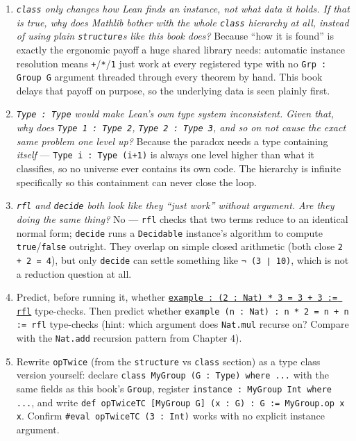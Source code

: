 \begin{enumerate}
\def\labelenumi{\arabic{enumi}.}
\item
  \emph{\texttt{class} only changes how Lean finds an instance, not what data it holds. If that is true, why does Mathlib bother with the whole \texttt{class} hierarchy at all, instead of using plain \texttt{structure}s like this book does?} Because ``how it is found'' is exactly the ergonomic payoff a huge shared library needs: automatic instance resolution means \texttt{+}/\texttt{*}/\texttt{1} just work at every registered type with no \texttt{Grp : Group G} argument threaded through every theorem by hand. This book delays that payoff on purpose, so the underlying data is seen plainly first.
\item
  \emph{\texttt{Type : Type} would make Lean's own type system inconsistent. Given that, why does \texttt{Type 1 : Type 2}, \texttt{Type 2 : Type 3}, and so on not cause the exact same problem one level up?} Because the paradox needs a type containing \emph{itself} --- \texttt{Type i : Type (i+1)} is always one level higher than what it classifies, so no universe ever contains its own code. The hierarchy is infinite specifically so this containment can never close the loop.
\item
  \emph{\texttt{rfl} and \texttt{decide} both look like they ``just work'' without argument. Are they doing the same thing?} No --- \texttt{rfl} checks that two terms reduce to an identical normal form; \texttt{decide} runs a \texttt{Decidable} instance's algorithm to compute \texttt{true}/\texttt{false} outright. They overlap on simple closed arithmetic (both close \texttt{2 + 2 = 4}), but only \texttt{decide} can settle something like \texttt{¬ (3 ∣ 10)}, which is not a reduction question at all.
\item
  Predict, before running it, whether \href{https://lean-lang.org/doc/reference/latest/Tactic-Proofs/Tactic-Reference/}{\texttt{example : (2 : Nat) * 3 = 3 + 3 := rfl}} type-checks. Then predict whether \texttt{example (n : Nat) : n * 2 = n + n := rfl} type-checks (hint: which argument does \texttt{Nat.mul} recurse on? Compare with the \texttt{Nat.add} recursion pattern from Chapter 4).
\item
  Rewrite \texttt{opTwice} (from the \texttt{structure} vs \texttt{class} section) as a type class version yourself: declare \texttt{class MyGroup (G : Type) where ...} with the same fields as this book's \texttt{Group}, register \texttt{instance : MyGroup Int where ...}, and write \texttt{def opTwiceTC [MyGroup G] (x : G) : G := MyGroup.op x x}. Confirm \texttt{\#eval opTwiceTC (3 : Int)} works with no explicit instance argument.

\end{enumerate}
